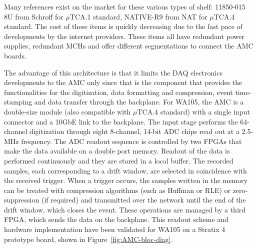 Many references exist on the market for these various types of
shelf: 
11850-015 8U from Schroff for $\mu$TCA.1
standard, NATIVE-R9 from NAT for $\mu$TCA.4 standard. The cost of
these items is quickly decreasing due to the fast pace of
developments by the internet providers. These items all have redundant power
supplies, redundant MCHs and offer different segmentations to connect
the AMC boards.



The advantage of this architecture is that it limits the DAQ electronics
developments to the AMC only since that is the component that provides
the functionalities for the digitization, data formatting and
compression, event time-stamping and data transfer through the
backplane. For WA105, the AMC is a double-size module (also compatible
with $\mu$TCA.4 standard) with a single input connector and a 10GbE
link to the backplane. The input stage performs the 64-channel
digitization through eight 8-channel, 14-bit ADC chips read out at a
2.5-MHz frequency. The ADC readout sequence is controlled by two FPGAs
that make the data available on a double port memory. Readout of the
data is performed continuously and they are stored in a local
buffer. The recorded samples, each corresponding to a drift window, are
selected in coincidence with the received trigger. When a trigger
occurs, the samples written in the memory can be treated with
compression algorithms (such as Huffman or RLE) or zero-suppression
(if required) and transmitted over the network until the end of the
drift window, which closes the event. These operations are managed by a
third FPGA, which sends the data on  the backplane.  This readout
scheme and hardware implementation have been validated for WA105 on a
Stratix 4 prototype board, shown in Figure~\ref{fig:AMC-bloc-diag}.


